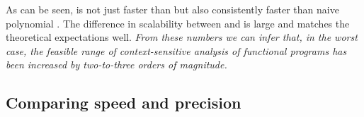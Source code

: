 As can be seen, \nCFA{} is not just faster than \kCFA{}
but also consistently faster than naive polynomial \kCFA{}. The difference
in scalability between \nCFA{} and \kCFA{} is large and matches
the theoretical expectations well.
\emph{From these numbers we can infer that, in the worst case, the
  feasible range of context-sensitive analysis of functional programs
  has been increased by two-to-three orders of magnitude.}


\begin{comment}
These analyses will also agree on control-flow (if not value-flow or
return-flow) information for strictly first-order programs that (a) do
not call the same function in more than one place and (b) lack dynamic
allocation (\eg, {\tt cons}). 
We modified a suite of cryptographic tools to meet these conditions,
and then ran the benchmarks on them:
\begin{center}
{
\small
\begin{tabular}{|c|c|c|c|c|}
\hline
\textsf{Prog}/\textsf{Terms} & \textsf{} & \textsf{} & \textsf{poly.,=1} & \textsf{=0}
\\
\hline
\hline
\textsf{fermat}/404 & 1.178 s  & 1.188 s & 1.129 s  & 1.005 s
\\
\hline
\textsf{rsa}/522 & 1.378 s &  1.186 s & 1.728 s & 1.282 s
\\
\hline
\textsf{solovay}/855 &  & 11 m 41 s & 16 s & 2 s
\\
\hline
\end{tabular}
}
\end{center}
The times represent the average of ten runs.
By hand-analyzing the results, we find that the extra time taken by
CFA in the Solovay-Strassen key generation algorithm is due to
increased return-flow precision.
We also find that naive polynomial 1CFA and 0CFA produce the same return-flow
information.

\emph{These results suggest that \nCFA{} is more efficient than
  -CFA, but that on first-order programs, context-sensitivity
  incurs a significant overhead.}

\end{comment}

\subsection{Comparing speed and precision}

